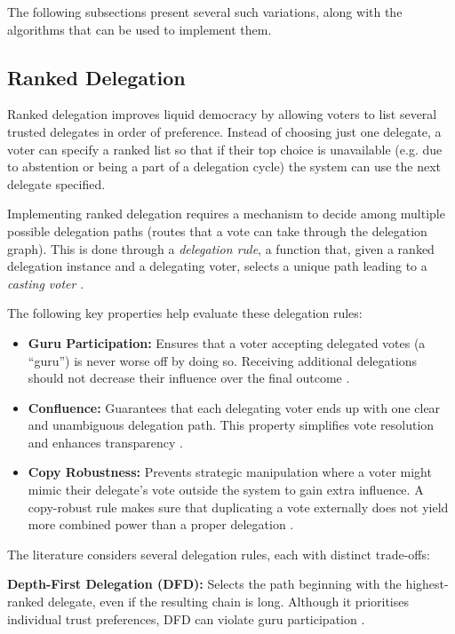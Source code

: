 The following subsections present several such variations, along with the algorithms that can be used to implement them.
\subsection*{Ranked Delegation}\label{subsec:background_ranked_delegation}
Ranked delegation improves liquid democracy by allowing voters to list several trusted delegates in order of preference. Instead of choosing just one delegate, a voter can specify a ranked list so that if their top choice is unavailable (e.g. due to abstention or being a part of a delegation cycle) the system can use the next delegate specified.

Implementing ranked delegation requires a mechanism to decide among multiple possible delegation paths (routes that a vote can take through the delegation graph).
This is done through a \textit{delegation rule}, a function that, given a ranked delegation instance and a delegating voter, selects a unique path leading to a \textit{casting voter} \citep{brill_liquid_2022}.

The following key properties help evaluate these delegation rules:

\begin{itemize}
  \item \textbf{Guru Participation:} Ensures that a voter accepting delegated votes (a ``guru'') is never worse off by doing so. Receiving additional delegations should not decrease their influence over the final outcome \citep{kotsialou_riley_2020}. 
  \item \textbf{Confluence:} Guarantees that each delegating voter ends up with one clear and unambiguous delegation path. This property simplifies vote resolution and enhances transparency \citep{brill_liquid_2022}. 
  \item \textbf{Copy Robustness:} Prevents strategic manipulation where a voter might mimic their delegate's vote outside the system to gain extra influence. A copy-robust rule makes sure that duplicating a vote externally does not yield more combined power than a proper delegation \citep{brill_liquid_2022,behrens_2015}. 
\end{itemize}

The literature considers several delegation rules, each with distinct trade-offs:

\textbf{Depth-First Delegation (DFD):} Selects the path beginning with the highest-ranked delegate, even if the resulting chain is long. Although it prioritises individual trust preferences, DFD can violate guru participation \citep{kotsialou_riley_2020}.

